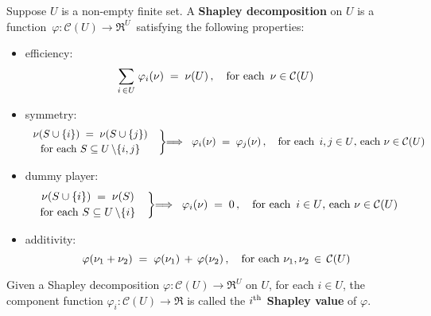 \begin{definition}
\label{definition:ShapleyDecomposition}
\mbox{}
\vskip 0.1cm
\noindent
Suppose $U$ is a non-empty finite set.
A \textbf{Shapley decomposition} on $U$ is a function
\,$\varphi : \mathcal{C}(U) \longrightarrow \Re^{U}$\,
satisfying the following properties:
\begin{itemize}
\item
	efficiency:
	\begin{equation*}
	\underset{i \,\in U}{\sum}\; \varphi_{i}(\nu) \; = \; \nu(U)\,,
	\quad
	\textnormal{for each \,$\nu \in \mathcal{C}(U)$}
	\end{equation*}
\item
	symmetry:\;\;
	\begin{equation*}
		\left.\begin{array}{c}
			\nu\!\left(S\cup\{i\}\right) \; = \; \nu\!\left(S\cup\{j\}\right)
			\\
			\textnormal{for each $\overset{{\color{white}.}}{S} \subseteq U\,\backslash \{i,j\}$}
		\end{array}
		\;\;\right\}\!\!\Longrightarrow\;\;
		\varphi_{i}(\nu) \; = \; \varphi_{j}(\nu)\,,
	\quad
		\textnormal{for each \,$i,j \in U$, each $\nu \in \mathcal{C}(U)$}
	\end{equation*}
\item
	dummy player:\;\;
	\begin{equation*}
		\left.\begin{array}{c}
			\nu\!\left(S\cup\{i\}\right) \; = \; \nu\!\left(S\right)
			\\
			\textnormal{for each $\overset{{\color{white}.}}{S} \subseteq U\,\backslash \{i\}$}
		\end{array}
		\;\;\right\}\!\!\Longrightarrow\;\;
		\varphi_{i}(\nu) \; = \; 0\,,
	\quad
		\textnormal{for each \,$i \in U$, each $\nu \in \mathcal{C}(U)$}
	\end{equation*}
\item
	additivity:\;\;
	\begin{equation*}
		\varphi(\nu_{1}+\nu_{2}) \; = \; \varphi(\nu_{1}) \, + \, \varphi(\nu_{2})\,,
	\quad
		\textnormal{for each $\nu_{1}, \nu_{2} \,\in\, \mathcal{C}(U)$}
	\end{equation*}
\end{itemize}
Given a Shapley decomposition
$\varphi : \mathcal{C}(U) \longrightarrow \Re^{U}$ on $U$,
for each $i \in U$, the component function
$\varphi_{i} : \mathcal{C}(U) \longrightarrow \Re$
is called the \textbf{$i^{\textnormal{th}}$ Shapley value} of $\varphi$.
\end{definition}

